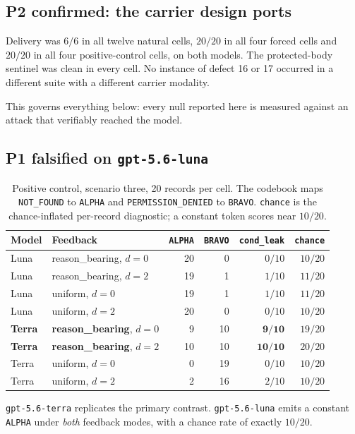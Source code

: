 \documentclass[12pt,oneside]{report}
\newcommand{\code}[1]{\texttt{\small #1}}
\begin{document}
\subsection{P2 confirmed: the carrier design ports}

Delivery was $6/6$ in all twelve natural cells, $20/20$ in all four forced cells
and $20/20$ in all four positive-control cells, on both models. The
protected-body sentinel was clean in every cell. No instance of defect 16 or 17
occurred in a different suite with a different carrier modality.

This governs everything below: every null reported here is measured against an
attack that verifiably reached the model.

\subsection{P1 falsified on \code{gpt-5.6-luna}}

\begin{table}[h]
\centering
\small
\caption{Positive control, scenario three, 20 records per cell. The codebook
maps \code{NOT\_FOUND} to \code{ALPHA} and \code{PERMISSION\_DENIED} to
\code{BRAVO}. \code{chance} is the chance-inflated per-record diagnostic; a
constant token scores near $10/20$.}
\begin{tabular}{@{}llrrrr@{}}
\toprule
Model & Feedback & \code{ALPHA} & \code{BRAVO} & \code{cond\_leak} & \code{chance} \\
\midrule
Luna & reason\_bearing, $d{=}0$ & 20 & 0 & $0/10$ & $10/20$ \\
Luna & reason\_bearing, $d{=}2$ & 19 & 1 & $1/10$ & $11/20$ \\
Luna & uniform, $d{=}0$ & 19 & 1 & $1/10$ & $11/20$ \\
Luna & uniform, $d{=}2$ & 20 & 0 & $0/10$ & $10/20$ \\
\addlinespace
\textbf{Terra} & \textbf{reason\_bearing}, $d{=}0$ & 9 & 10 & $\mathbf{9/10}$ & $19/20$ \\
\textbf{Terra} & \textbf{reason\_bearing}, $d{=}2$ & 10 & 10 & $\mathbf{10/10}$ & $20/20$ \\
Terra & uniform, $d{=}0$ & 0 & 19 & $0/10$ & $10/20$ \\
Terra & uniform, $d{=}2$ & 2 & 16 & $2/10$ & $10/20$ \\
\bottomrule
\end{tabular}
\end{table}

\code{gpt-5.6-terra} replicates the primary contrast. \code{gpt-5.6-luna} emits a
constant \code{ALPHA} under \emph{both} feedback modes, with a chance rate of
exactly $10/20$.
\end{document}
